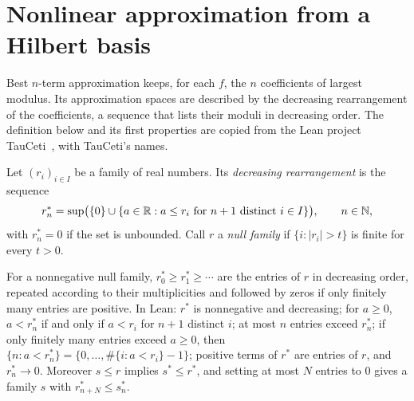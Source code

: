 \section{Nonlinear approximation from a Hilbert basis}
\label{sec:nterm-hilbert-basis}

Best $n$-term approximation keeps, for each $f$, the $n$ coefficients of largest modulus. Its
approximation spaces are described by the decreasing rearrangement of the coefficients, a
sequence that lists their moduli in decreasing order. The definition below and its first
properties are copied from the Lean project TauCeti~\cite{TauCeti}, with TauCeti's names.

\begin{definition}
\label{def:decreasing-rearrangement}
\leanok
Let $(r_i)_{i \in I}$ be a family of real numbers. Its \emph{decreasing rearrangement} is the
sequence
\[
  r^*_n = \sup\bigl(\{0\} \cup \{a \in \mathbb{R} : a \leq r_i \text{ for } n + 1 \text{ distinct }
  i \in I\}\bigr), \qquad n \in \mathbb{N},
\]
with $r^*_n = 0$ if the set is unbounded. Call $r$ a \emph{null family} if
$\{i : |r_i| > t\}$ is finite for every $t > 0$.
\end{definition}

For a nonnegative null family, $r^*_0 \geq r^*_1 \geq \cdots$ are the entries of $r$ in
decreasing order, repeated according to their multiplicities and followed by zeros if only
finitely many entries are positive. In Lean: $r^*$ is nonnegative and decreasing; for
$a \geq 0$, $a < r^*_n$ if and only if $a < r_i$ for $n + 1$ distinct $i$; at most $n$ entries
exceed $r^*_n$; if only finitely many entries exceed $a \geq 0$, then
$\{n : a < r^*_n\} = \{0, \dots, \#\{i : a < r_i\} - 1\}$; positive terms of $r^*$ are entries
of $r$, and $r^*_n \to 0$. Moreover $s \leq r$ implies $s^* \leq r^*$, and setting at most $N$
entries to $0$ gives a family $s$ with $r^*_{n+N} \leq s^*_n$.

